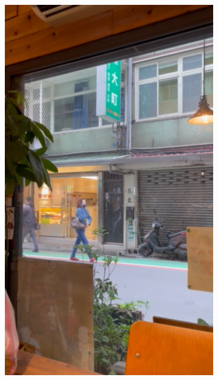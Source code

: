 \documentclass[12pt]{article}
\theoremstyle{definition}
\begin{document}
\begin{figure}[ht]
     \centering
     \begin{subfigure}[b]{0.3\textwidth}
         \centering
         \includegraphics[width=\textwidth]{ch3_figures/video_1.png}
         \label{fig:video_1}
     \end{subfigure}
     \hfill
     \begin{subfigure}[b]{0.3\textwidth}
         \centering

\end{subfigure}
\end{figure}
\end{document}
